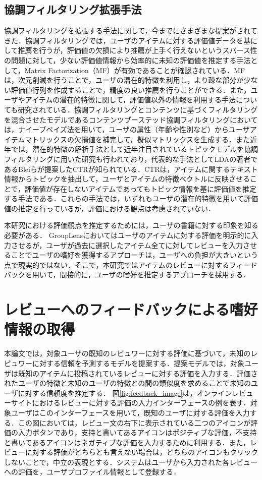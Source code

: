 \documentclass[a4paper,11pt,oneside,openany]{jsbook}
\begin{document}
	\section{協調フィルタリング拡張手法}
協調フィルタリングを拡張する手法に関して，今までにさまざまな提案がされてきた．協調フィルタリングでは，ユーザのアイテムに対する評価値データを基にして推薦を行うが，評価値の欠損により推薦が上手く行えないというスパース性の問題に対して，少ない評価値情報から効率的に未知の評価値を推定する手法として，Matrix Factorization（MF）\cite{MF}が有効であることが確認されている．MFは，次元削減を行うことで，ユーザの潜在的特徴を利用し，より疎な部分が少ない評価値行列を作成することで，精度の良い推薦を行うことができる．また，ユーザやアイテムの潜在的特徴に関して，評価値以外の情報を利用する手法についても研究されている．協調フィルタリングとコンテンツに基づくフィルタリングを混合させたモデルであるコンテンツブーステッド協調フィルタリング\cite{Melville}においては，ナイーブベイズ法を用いて，ユーザの属性（年齢や性別など）からユーザアイテムマトリックスの欠損値を補完して，擬似マトリックスを生成する．また近年では，潜在的特徴の解析手法として近年注目されているトピックモデルを協調フィルタリングに用いた研究も行われており，代表的な手法としてLDAの著者であるBleiらが提案したCTRが知られている\cite{CTR}．CTRは，アイテムに関するテキスト情報からトピックを抽出して，ユーザとアイテムの特徴ベクトルに反映させることで，評価値が存在しないアイテムであってもトピック情報を基に評価値を推定する手法である．これらの手法では，いずれもユーザの潜在的特徴を用いて評価値の推定を行っているが，評価における観点は考慮されていない．
\par
本研究における評価観点を推定するためには，ユーザの書籍に対する印象を知る必要がある．
GroupLens\cite{grouplens}においてはユーザのアイテムに対する評価を明示的に入力させるが，ユーザが過去に選択したアイテム全てに対してレビューを入力させることでユーザの嗜好を獲得するアプローチは，ユーザへの負担が大きいという点で現実的ではない．そこで，本研究ではアイテムのレビューに対するフィードバックを用いて，間接的に，ユーザの嗜好を推定するアプローチを採用する．


\chapter{レビューへのフィードバックによる嗜好情報の取得}
\label{sec:feedback}
本論文では，対象ユーザの既知のレビュワーに対する評価に基づいて，未知のレビュワーに対する信頼を予測するモデルを提案する．提案モデルでは，対象ユーザは既知のアイテムに投稿されているレビューに対する評価を入力する．評価されたユーザの特徴と未知のユーザの特徴との間の類似度を求めることで未知のユーザに対する信頼度を推定する．
図\ref{fig:feedback_image}は，オンラインレビューサイトにおけるレビューに対する評価の入力インターフェースの例を表す．対象ユーザはこのインターフェースを用いて，既知のユーザに対する評価を入力する．この図においては，レビュー文の右下に表示されている二つのアイコンが評価の入力ボタンであり，支持と書いてあるアイコンはポジティブな評価，不支持と書いてあるアイコンはネガティブな評価を入力するために利用する．また，レビューに対する評価がどちらとも言えない場合は，どちらのアイコンもクリックしないことで，中立の表現とする．システムはユーザから入力された各レビューへの評価を，ユーザプロファイル情報として登録する．
\end{document}
